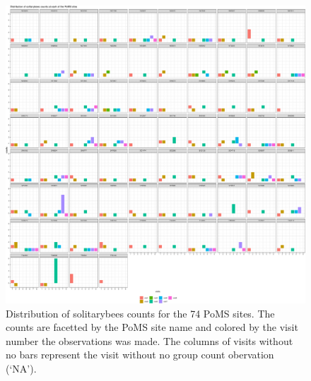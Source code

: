 \documentclass[
]{article}
\begin{document}
\begin{figure}

{\centering \includegraphics{SupplementaryInformationOne_files/figure-pdf/fig-sbGCPlot-1.pdf}

}

\caption{\label{fig-sbGCPlot}Distribution of solitarybees counts for the
74 PoMS sites. The counts are facetted by the PoMS site name and colored
by the visit number the observations was made. The columns of visits
without no bars represent the visit without no group count obervation
(`NA').}

\end{figure}
\end{document}
